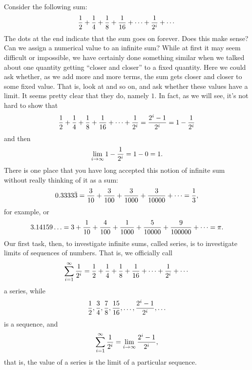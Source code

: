 Consider the following sum:
$${1\over2}+{1\over4}+{1\over8}+{1\over16}+\cdots+{1\over2^i}+\cdots$$
The dots at the end indicate that the sum goes on forever. Does this
make sense? Can we assign a numerical value to an infinite sum? While
at first it may seem difficult or impossible, we have certainly done
something similar when we talked about one quantity getting ``closer
and closer'' to a fixed quantity. Here we could ask whether, as we add
more and more terms, the sum gets closer and closer to some fixed
value. That is, look at
and so on, and ask whether these values have a limit. It seems pretty
clear that they do, namely $1$. In fact, as we will see, it's not hard
to show that 
$${1\over2}+{1\over4}+{1\over8}+{1\over16}+\cdots+{1\over2^i}=
{2^i-1\over2^i}=1-{1\over2^i}$$
and then
$$\lim_{i\to\infty} 1-{1\over2^i}=1-0=1.$$
There is one place that you have long accepted this notion of infinite
sum without really thinking of it as a sum:
$$0.3333\bar3 =
{3\over10}+{3\over100}+{3\over1000}+{3\over10000}+\cdots=
{1\over3},$$
for example, or
$$3.14159\ldots = 3+{1\over10}+{4\over100}+{1\over1000}+{5\over10000}+
{9\over100000}+\cdots = \pi.$$
Our first task, then,  to investigate infinite sums, called 
{\dfont series\/}, is to investigate limits of {\dfont
  sequences\/} of numbers. That is, we officially
call
$$\sum_{i=1}^\infty {1\over2^i}=
{1\over2}+{1\over4}+{1\over8}+{1\over16}+\cdots+{1\over2^i}+\cdots$$
a series, while
$${1\over2},{3\over4},{7\over8},{15\over16},\ldots,{2^i-1\over2^i},\ldots$$
is a sequence, and
$$\sum_{i=1}^\infty {1\over2^i}=\lim_{i\to\infty} {2^i-1\over2^i},$$
that is, the value of a series is the limit of a particular sequence.


